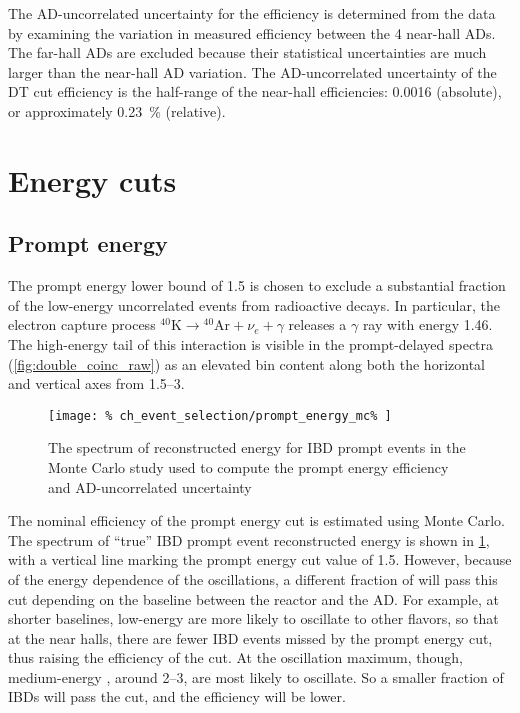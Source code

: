 The AD-uncorrelated uncertainty for the efficiency
is determined from the data by examining the variation
in measured efficiency between the 4 near-hall ADs.
The far-hall ADs are excluded because
their statistical uncertainties are much larger than the
near-hall AD variation.
The AD-uncorrelated uncertainty of the DT cut efficiency
is the half-range of the near-hall efficiencies: \num{0.0016} (absolute),
or approximately \SI{0.23}{\percent} (relative).

\section{Energy cuts}

\subsection{Prompt energy}
The prompt energy lower bound of \SI{1.5}{\mev}
is chosen to exclude a substantial fraction
of the low-energy uncorrelated events from radioactive decays.
In particular, the electron capture process
${}^{40}\text{K} \to {}^{40}\text{Ar} + \nu_e + \gamma$
releases a $\gamma$ ray with energy \SI{1.46}{\mev}.
The high-energy tail of this interaction is visible in the prompt-delayed spectra
(\cref{fig:double_coinc_raw}) as an elevated bin content
along both the horizontal and vertical axes from \SIrange{1.5}{3}{\mev}.

\begin{figure}
    \centering
    \texttt{[image: \%
        ch\_event\_selection/prompt\_energy\_mc\%
    ]}
    \caption{The spectrum of reconstructed energy for IBD prompt events
        in the Monte Carlo study used to compute the prompt energy efficiency
    and AD-uncorrelated uncertainty}
    \label{fig:prompt_eff_mc}
\end{figure}
The nominal efficiency of the prompt energy cut is estimated using Monte Carlo.
The spectrum of ``true'' IBD prompt event reconstructed energy
is shown in \cref{fig:prompt_eff_mc},
with a vertical line marking the prompt energy cut value of \SI{1.5}{\mev}.
However, because of the energy dependence of the \nuebar{} oscillations,
a different fraction of \nuebar{} will pass this cut
depending on the baseline between the reactor and the AD.
For example, at shorter baselines, low-energy \nuebar{}
are more likely to oscillate to other flavors, so that at the near halls,
there are fewer IBD events missed by the prompt energy cut,
thus raising the efficiency of the cut.
At the oscillation maximum, though, medium-energy \nuebar{},
around \SIrange{2}{3}{\mev}, are most likely to oscillate.
So a smaller fraction of IBDs will pass the cut,
and the efficiency will be lower.

